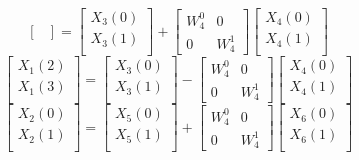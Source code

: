 \documentclass[journal,12pt,twocolumn]{IEEEtran}
\renewcommand\thesection{\arabic{section}}
\begin{document}
\begin{enumerate}[label=\thesection.\arabic*]
\begin{equation}
\begin{bmatrix}
\end{bmatrix}
=
\begin{bmatrix}
X_{3}(0) \\ 
X_{3}(1)\\ 
\end{bmatrix}
+
\begin{bmatrix}
W^{0}_{4} & 0\\
0 & W^{1}_{4}
\end{bmatrix}
\begin{bmatrix}
X_{4}(0) \\ 
X_{4}(1) \\ 
\end{bmatrix}
\end{equation}
\begin{equation}
\begin{bmatrix}
X_{1}(2) \\ 
X_{1}(3)\\ 
\end{bmatrix}
=
\begin{bmatrix}
X_{3}(0) \\ 
X_{3}(1)\\ 
\end{bmatrix}
-
\begin{bmatrix}
W^{0}_{4} & 0\\
0 & W^{1}_{4}
\end{bmatrix}
\begin{bmatrix}
X_{4}(0) \\ 
X_{4}(1) \\ 
\end{bmatrix}
\end{equation}
\begin{equation}
\begin{bmatrix}
X_{2}(0) \\ 
X_{2}(1)\\ 
\end{bmatrix}
=
\begin{bmatrix}
X_{5}(0) \\ 
X_{5}(1)\\ 
\end{bmatrix}
+
\begin{bmatrix}
W^{0}_{4} & 0\\
0 & W^{1}_{4}
\end{bmatrix}
\begin{bmatrix}
X_{6}(0) \\ 
X_{6}(1) \\ 
\end{bmatrix}
\end{equation}

\end{enumerate}
\end{document}
